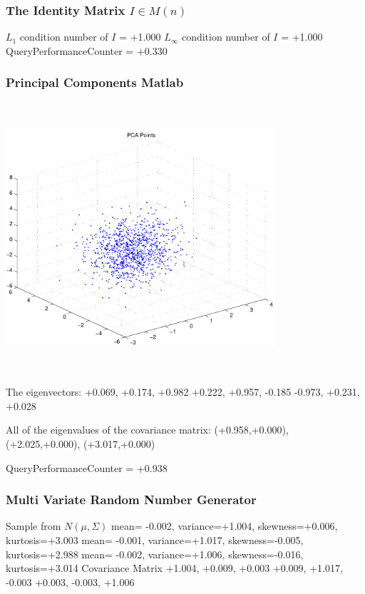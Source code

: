 \documentclass[9pt]{article}
\theoremstyle{plain}
\theoremstyle{definition}
\theoremstyle{remark}
\numberwithin{equation}{section}
\begin{document}
\subsubsection{The Identity Matrix $I \in M(n)$}
$L_1$ condition number of $I$ = +1.000
$L_\infty$ condition number of $I$ = +1.000
QueryPerformanceCounter  =  +0.330
\subsubsection{Principal Components Matlab }
\includegraphics[width=10.0cm,height=10.0cm]{PCAPoints.pdf}

The eigenvectors:
+0.069, +0.174, +0.982
+0.222, +0.957, -0.185
-0.973, +0.231, +0.028

All of the eigenvalues of the covariance matrix:
(+0.958,+0.000), (+2.025,+0.000), (+3.017,+0.000)

QueryPerformanceCounter  =  +0.938
\subsubsection{Multi Variate Random Number Generator }
Sample from $N(\mu,\Sigma)$
mean= -0.002, variance=+1.004, skewness=+0.006, kurtosis=+3.003
mean= -0.001, variance=+1.017, skewness=-0.005, kurtosis=+2.988
mean= -0.002, variance=+1.006, skewness=-0.016, kurtosis=+3.014
Covariance Matrix 
+1.004, +0.009, +0.003
+0.009, +1.017, -0.003
+0.003, -0.003, +1.006
\end{document}
